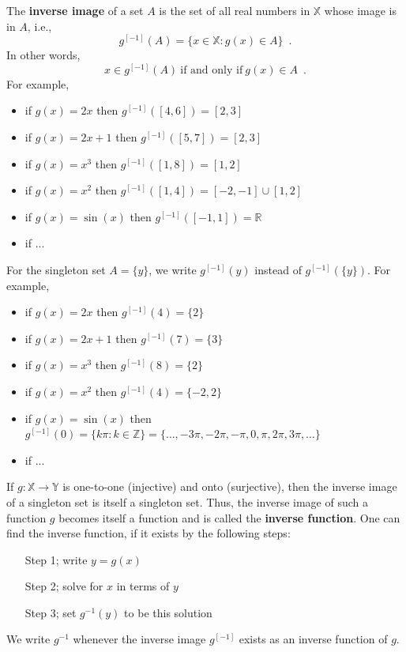 The {\bf inverse image} of a set $A$ is the set of all real numbers in $\mathbb{X}$ whose image is in $A$, i.e.,
\[
g^{[-1]}(A) = \{x \in \mathbb{X} : g(x) \in A \} \enspace .
\] 
In other words,
\[
x \in g^{[-1]}(A) \ \text{if and only if} \ g(x) \in A \enspace .
\]
For example,
\begin{itemize}
\item if $g(x)=2x$ then $g^{[-1]}([4,6])=[2,3]$
\item if $g(x)=2x+1$ then $g^{[-1]}([5,7])=[2,3]$
\item if $g(x)=x^3$ then $g^{[-1]}([1,8])=[1,2]$
\item if $g(x)=x^2$ then $g^{[-1]}([1,4])=[-2,-1] \cup [1,2]$
\item if $g(x)=\sin(x)$ then $g^{[-1]}([-1,1])=\mathbb{R}$
\item if ... %
\end{itemize}
For the singleton set $A = \{y\}$, we write $g^{[-1]}(y)$ instead of $g^{[-1]}(\{y\})$.  
For example,
\begin{itemize}
\item if $g(x)=2x$ then $g^{[-1]}(4)=\{2\}$
\item if $g(x)=2x+1$ then $g^{[-1]}(7)=\{3\}$
\item if $g(x)=x^3$ then $g^{[-1]}(8)=\{2\}$
\item if $g(x)=x^2$ then $g^{[-1]}(4)=\{-2,2\}$
\item if $g(x)=\sin(x)$ then $g^{[-1]}(0)=\{k \pi: k \in \mathbb{Z}\} = \{\ldots, -3 \pi, -2 \pi, -\pi,0,\pi, 2\pi,3\pi, \ldots\}$
\item if ... %
\end{itemize}
If $g:\mathbb{X}\to\mathbb{Y}$ is one-to-one (injective) and onto (surjective), then the inverse image of a singleton set is itself a singleton set.  
Thus, the inverse image of such a function $g$ becomes itself a function and is called the {\bf inverse function}.
One can find the inverse function, if it exists by the following steps:
\begin{itemize}
\item[{\sf Step 1;}] write $y=g(x)$
\item[{\sf Step 2;}] solve for $x$ in terms of $y$
\item[{\sf Step 3;}] set $g^{-1}(y)$ to be this solution
\end{itemize}
We write $g^{-1}$ whenever the inverse image $g^{[-1]}$ exists as an inverse function of $g$.  

